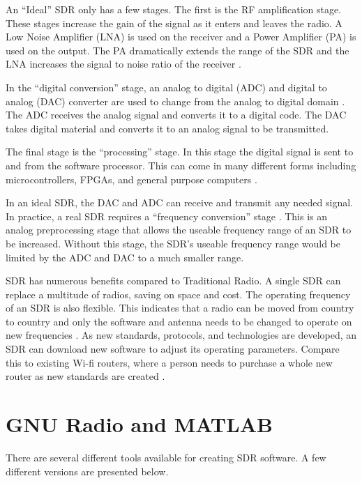 An ``Ideal'' SDR only has a few stages. The first is the RF amplification stage. These stages increase the gain of the signal as it enters and leaves the radio. A Low Noise Amplifier (LNA) is used on the receiver and a Power Amplifier (PA) is used on the output. The PA dramatically extends the range of the SDR and the LNA increases the signal to noise ratio of the receiver \cite{761033}. 

In the ``digital conversion'' stage, an analog to digital (ADC) and digital to analog (DAC) converter are used to change from the analog to digital domain \cite{761033}\cite{0020}. The ADC receives the analog signal and converts it to a digital code. The DAC takes digital material and converts it to an analog signal to be transmitted. 

The final stage is the ``processing'' stage. In this stage the digital signal is sent to and from the software processor. This can come in many different forms including microcontrollers, FPGAs, and general purpose computers \cite{393001}\cite{0020}.  

In an ideal SDR, the DAC and ADC can receive and transmit any needed signal. In practice, a real SDR requires a ``frequency conversion'' stage \cite{393001} \cite{0020}. This is an analog preprocessing stage that allows the useable frequency range of an SDR to be increased. Without this stage, the SDR's useable frequency range would be limited by the ADC and DAC to a much smaller range. 

SDR has numerous benefits compared to Traditional Radio. A single SDR can replace a multitude of radios, saving on space and cost. The operating frequency of an SDR is also flexible. This indicates that a radio can be moved from country to country and only the software and antenna needs to be changed to operate on new frequencies \cite{393001} \cite{0019}. As new standards, protocols, and technologies are developed, an SDR can download new software to adjust its operating parameters. Compare this to existing Wi-fi routers, where a person needs to purchase a whole new router as new standards are created \cite{761033} \cite{0019}. 


\section{GNU Radio and MATLAB}

There are several different tools available for creating SDR software. A few different versions are presented below. 

